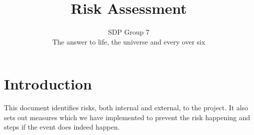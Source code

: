 \documentclass{article}
\begin{document}
\title{Risk Assessment}
\author{SDP Group 7\\
The answer to life, the universe and every over six
}
\maketitle

\section{Introduction}

This document identifies risks, both internal and external, to the project. It
also sets out measures which we have implemented to prevent the risk
happening and steps if the event does indeed happen.
\end{document}
